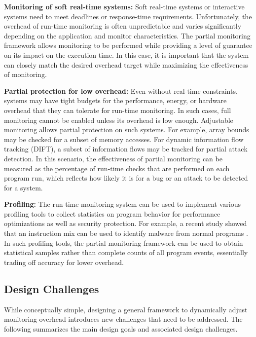 {\bf Monitoring of soft real-time systems:}
Soft real-time systems or interactive systems need to meet deadlines or
response-time requirements. Unfortunately, the overhead of run-time monitoring
is often unpredictable and varies significantly depending on the application
and monitor characteristics. The partial monitoring framework allows monitoring
to be performed while providing a level of guarantee on its impact on the
execution time.  In this case, it is important that the system can closely
match the desired overhead target while maximizing the effectiveness of
monitoring.

{\bf Partial protection for low overhead:}
Even without real-time constraints, systems may have tight budgets for the
performance, energy, or hardware overhead that they can tolerate for run-time
monitoring. In such cases, full monitoring cannot be enabled unless its
overhead is low enough. Adjustable monitoring allows partial protection on such
systems. For example, array bounds may be checked for a subset of memory
accesses. For dynamic information flow tracking (DIFT), a subset of information
flows may be tracked for partial attack detection. In this scenario, the
effectiveness of partial monitoring can be measured as the percentage of
run-time checks that are performed on each program run, which reflects how
likely it is for a bug or an attack to be detected for a system. 

{\bf Profiling:} 
The run-time monitoring system can be used to implement various profiling tools
to collect statistics on program behavior for performance optimizations as well
as security protection. For example, a recent study showed that an instruction
mix can be used to identify malware from normal programs \cite{demme-isca13,
tang-raid14}.  In such profiling tools, the partial monitoring framework can be
used to obtain statistical samples rather than complete counts of all program
events, essentially trading off accuracy for lower overhead.

\subsection{Design Challenges}

While conceptually simple, designing a general framework to dynamically adjust
monitoring overhead introduces new challenges that need to be addressed.  The
following summarizes the main design goals and associated design challenges.

